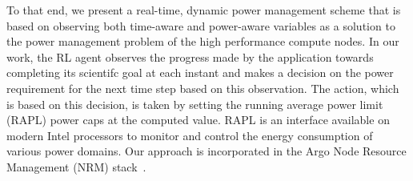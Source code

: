 To that end, we present a real-time, dynamic power management scheme that is based on observing both time-aware and power-aware variables as a solution to the power management problem of the high performance compute nodes. 
In our work, the RL agent observes the progress made by the application towards completing its scientifc goal at each instant and makes a decision on the power requirement for the next time step based on this observation. The action, which is based on this decision, is taken by setting the running average power limit (RAPL) power caps at the computed value. RAPL is an interface available on modern Intel processors to monitor and control the energy consumption of various power domains. Our approach is incorporated in the Argo Node Resource Management (NRM) stack~\cite{anrm}.


